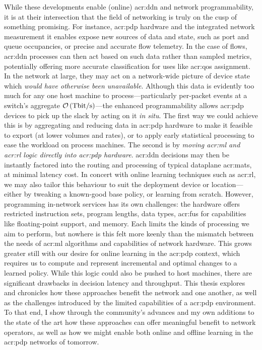 While these developments enable (online) \gls{acr:ddn} and network programmability, it is at their intersection that the field of networking is truly on the cusp of something promising.
For instance, \gls{acr:pdp} hardware and the integrated network measurement it enables expose new sources of data and state, such as port and queue occupancies, or precise and accurate flow telemetry.
In the case of flows, \gls{acr:ddn} processes can then act based on such data rather than sampled metrics, potentially offering more accurate classification for uses like \gls{acr:qos} assignment.
In the network at large, they may act on a network-wide picture of device state which \emph{would have otherwise been unavailable}.
Although this data is evidently too much for any one host machine to process---particularly per-packet events at a switch's aggregate $\mathcal{O}\left(\unit{\tera\bit\per\second}\right)$---the enhanced programmability allows \gls{acr:pdp} devices to pick up the slack by acting on it \emph{in situ}.
The first way we could achieve this is by aggregating and reducing data in \gls{acr:pdp} hardware to make it feasible to export (at lower volumes and rates), or to apply early statistical processing to ease the workload on process machines.
The second is by \emph{moving \gls{acr:ml} and \gls{acr:rl} logic directly into \gls{acr:pdp} hardware}.
\gls{acr:ddn} decisions may then be instantly factored into the routing and processing of typical dataplane \glspl{acr:mat}, at minimal latency cost.
In concert with online learning techniques such as \gls{acr:rl}, we may also tailor this behaviour to suit the deployment device or location---either by tweaking a known-good base policy, or learning from scratch.
However, programming in-network services has its own challenges: the hardware offers restricted instruction sets, program lengths, data types, \glspl{acr:fu} for capabilities like floating-point support, and memory.
Each limits the kinds of processing we aim to perform, but nowhere is this felt more keenly than the mismatch between the needs of \gls{acr:ml} algorithms and capabilities of network hardware.
This grows greater still with our desire for online learning in the \gls{acr:pdp} context, which requires us to compute and represent incremental and optimal changes to a learned policy.
While this logic could also be pushed to host machines, there are significant drawbacks in decision latency and throughput.
This thesis explores and chronicles how these approaches benefit the network and one another, as well as the challenges introduced by the limited capabilities of a \gls{acr:pdp} environment.
To that end, I show through the community's advances and my own additions to the state of the art how these approaches can offer meaningful benefit to network operators, as well as how we might enable both online and offline learning in the \gls{acr:pdp} networks of tomorrow.

